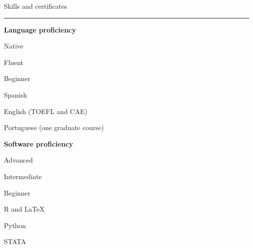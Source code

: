 \documentclass[a4paper, 12pt]{article}
\begin{document}
\large Skills and certificates
\smallskip
\hrule
\normalsize


\bigskip
\textbf{Language proficiency}

\begin{multicols}{2}

Native

Fluent

Beginner

\columnbreak

Spanish

English (TOEFL and CAE)

Portuguese (one graduate course)

\end{multicols}


\textbf{Software proficiency}

\begin{multicols}{2}

Advanced

Intermediate

Beginner

\columnbreak

\textsf{R} and \LaTeX

\textsf{Python}

\textsf{STATA}

\end{multicols}
\end{document}
